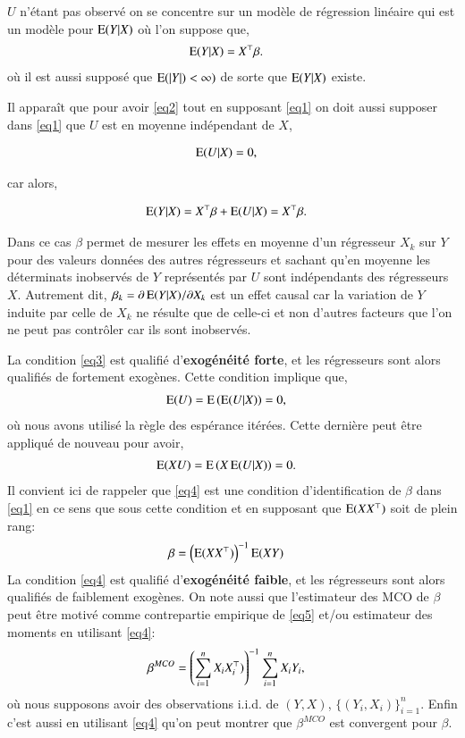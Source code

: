 $U$ n'étant pas observé on se concentre sur un modèle de régression linéaire qui est un modèle pour $\operatorname{E}(Y|X)$ 
où l'on suppose que,
\begin{align}
	\operatorname{E}(Y|X) &= X^\top \beta.
	\label{eq2}
\end{align}
où il est aussi  supposé que $\operatorname{E}(\left\vert {Y} \right\vert) < \infty)$ de sorte que $\operatorname{E}(Y|X)$ existe.

Il apparaît que pour avoir \eqref{eq2} tout en supposant \eqref{eq1} on doit 
aussi supposer dans \eqref{eq1} que $U$ est en moyenne indépendant de $X$,

\begin{align}
\operatorname{E}(U|X) &=0,
\label{eq3}
\end{align}

 car alors,

\begin{align*}
	\operatorname{E}(Y|X)&=X^\top\beta +\operatorname{E}(U|X) = X^\top\beta.
\end{align*}

Dans ce cas $\beta$ permet de mesurer les effets en moyenne d'un régresseur $X_k$ sur $Y$ pour 
des valeurs données des autres régresseurs et sachant qu'en moyenne 
les déterminats inobservés de $Y$ représentés par $U$ sont indépendants des régresseurs $X$. Autrement dit,
$\beta_k = \partial \operatorname{E}(Y|X)/\partial X_k$ est un effet causal car la variation de $Y$ induite par celle de $X_k$
ne résulte que de celle-ci et non d'autres facteurs que l'on ne peut pas contrôler car ils sont inobservés.

La condition \eqref{eq3} est qualifié d'\textbf{exogénéité forte}, et les régresseurs sont alors qualifiés de fortement exogènes. 
Cette condition implique que, 
\begin{align*}
	\operatorname{E}(U) &= \operatorname{E}\left(\operatorname{E}(U|X)\right) = 0,
\end{align*}
où nous avons utilisé la règle des espérance itérées. Cette dernière peut être appliqué de nouveau pour avoir,
\begin{align}
	\operatorname{E}(XU) &= \operatorname{E}\left(X\operatorname{E}(U|X)\right) = 0.
	\label{eq4}
\end{align}
Il convient ici de rappeler que \eqref{eq4} est une condition d'identification de $\beta$ dans \eqref{eq1} en ce sens que
sous cette condition et en supposant que $\operatorname{E}(XX^\top)$ soit de plein rang:
\begin{align}
\beta &=\left(\operatorname{E}(XX^\top)\right)^{-1}\operatorname{E}(XY)
\label{eq5}
\end{align}
La condition \eqref{eq4} est qualifié d'\textbf{exogénéité faible}, et les régresseurs sont alors qualifiés de faiblement exogènes. 
On note aussi que l'estimateur des MCO de $\beta$ peut être motivé comme contrepartie empirique de \eqref{eq5} et/ou
estimateur des moments en utilisant \eqref{eq4}:
\begin{align}
	\beta^{MCO} &=\left(\sum_{i=1}^n X_iX_i^\top)\right)^{-1}\sum_{i=1}^n X_iY_i,
	\label{eq6}
\end{align}
où nous supposons avoir des observations i.i.d. de $(Y, X)$, $\{(Y_i, X_i)\}_{i=1}^n$. Enfin c'est aussi en 
utilisant  \eqref{eq4} qu'on peut montrer que $\beta^{MCO}$ est convergent pour $\beta$.

